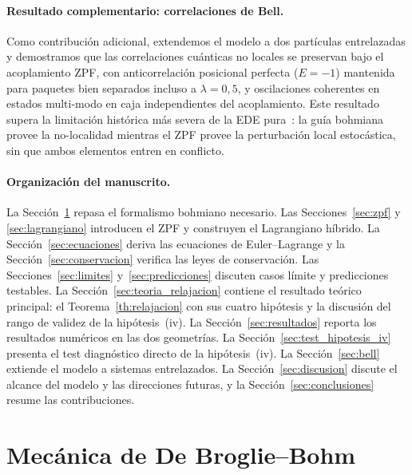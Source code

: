 \documentclass[11pt,a4paper]{article}
\begin{document}
\paragraph{Resultado complementario: correlaciones de Bell.}
Como contribución adicional, extendemos el modelo a dos partículas
entrelazadas y demostramos que las correlaciones cuánticas no locales se
preservan bajo el acoplamiento ZPF, con anticorrelación posicional
perfecta ($E=-1$) mantenida para paquetes bien separados incluso a
$\lambda=0{,}5$, y oscilaciones coherentes en estados multi-modo en caja
independientes del acoplamiento. Este resultado supera la limitación
histórica más severa de la EDE pura~\cite{Marshall1980}: la guía
bohmiana provee la no-localidad mientras el ZPF provee la perturbación
local estocástica, sin que ambos elementos entren en conflicto.

\paragraph{Organización del manuscrito.}
La Sección~\ref{sec:bohm} repasa el formalismo bohmiano necesario.
Las Secciones~\ref{sec:zpf} y \ref{sec:lagrangiano} introducen el ZPF y
construyen el Lagrangiano híbrido. La Sección~\ref{sec:ecuaciones}
deriva las ecuaciones de Euler--Lagrange y la Sección~\ref{sec:conservacion}
verifica las leyes de conservación. Las Secciones~\ref{sec:limites}
y~\ref{sec:predicciones} discuten casos límite y predicciones testables.
La Sección~\ref{sec:teoria_relajacion} contiene el resultado teórico
principal: el Teorema~\ref{th:relajacion} con sus cuatro hipótesis y la
discusión del rango de validez de la hipótesis~(iv). La
Sección~\ref{sec:resultados} reporta los resultados numéricos en las dos
geometrías. La Sección~\ref{sec:test_hipotesis_iv} presenta el test
diagnóstico directo de la hipótesis~(iv). La Sección~\ref{sec:bell}
extiende el modelo a sistemas entrelazados. La
Sección~\ref{sec:discusion} discute el alcance del modelo y las
direcciones futuras, y la Sección~\ref{sec:conclusiones} resume las
contribuciones.

\section{Mecánica de De Broglie--Bohm}
\label{sec:bohm}
\end{document}
